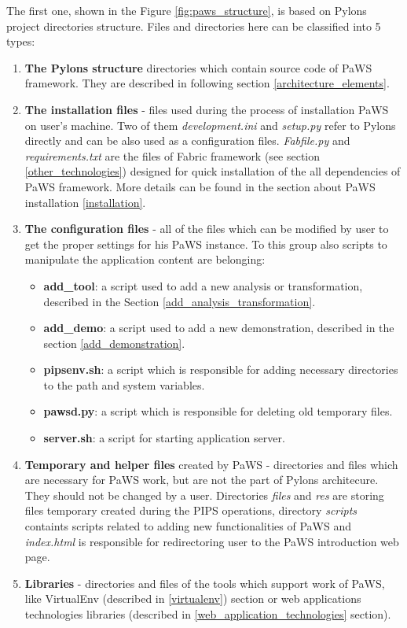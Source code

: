The first one, shown in the Figure \ref{fig:paws_structure}, is based on Pylons project directories structure. Files and directories here can be classified into 5 types:
\begin{enumerate}
  \item {\bf The Pylons structure} directories which contain source code of PaWS framework. They are described in following section \ref{architecture_elements}.
  \item {\bf The installation files} - files used during the process of installation PaWS on user's machine. Two of them \emph{development.ini} and \emph{setup.py} refer to Pylons directly and can be also used as a configuration files. \emph{Fabfile.py} and \emph{requirements.txt} are the files of Fabric framework (see section \ref{other_technologies}) designed for quick installation of the all dependencies of PaWS framework. More details can be found in the section about PaWS installation \ref{installation}.
  \item {\bf The configuration files} - all of the files which can be modified by user to get the proper settings for his PaWS instance. To this group also scripts to manipulate the application content are belonging:
  \begin{itemize}
    \item {\bf add\_tool}: a script used to add a new analysis or transformation, described in the Section \ref{add_analysis_transformation}.
    \item {\bf add\_demo}: a script used to add a new demonstration, described in the section \ref{add_demonstration}.
    \item {\bf pipsenv.sh}: a script which is responsible for adding necessary directories to the path and system variables.
    \item {\bf pawsd.py}: a script which is responsible for deleting old temporary files.
    \item {\bf server.sh}: a script for starting application server.
  \end{itemize}
  \item {\bf Temporary and helper files} created by PaWS - directories and files which are necessary for PaWS work, but are not the part of Pylons architecure. They should not be changed by a user. Directories \emph{files} and \emph{res} are storing files temporary created during the PIPS operations, directory \emph{scripts} containts scripts related to adding new functionalities of PaWS and \emph{index.html} is responsible for redirectoring user to the PaWS introduction web page.
  \item {\bf Libraries} - directories and files of the tools which support work of PaWS, like VirtualEnv (described in \ref{virtualenv}) section or web applications technologies libraries (described in \ref{web_application_technologies} section).
\end{enumerate}

